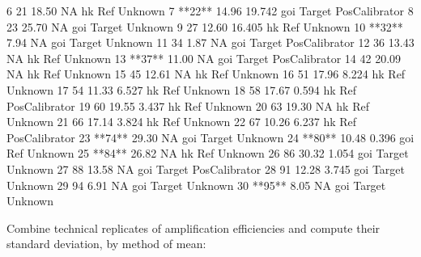 \documentclass[11pt]{article}
\begin{document}
\begin{Schunk}
\begin{Soutput}
6      21 18.50     NA                hk                     Ref Unknown
7  **22** 14.96 19.742               goi            Target PosCalibrator
8      23 25.70     NA               goi                  Target Unknown
9      27 12.60 16.405                hk                     Ref Unknown
10 **32**  7.94     NA               goi                  Target Unknown
11     34  1.87     NA               goi            Target PosCalibrator
12     36 13.43     NA                hk                     Ref Unknown
13 **37** 11.00     NA               goi            Target PosCalibrator
14     42 20.09     NA                hk                     Ref Unknown
15     45 12.61     NA                hk                     Ref Unknown
16     51 17.96  8.224                hk                     Ref Unknown
17     54 11.33  6.527                hk                     Ref Unknown
18     58 17.67  0.594                hk               Ref PosCalibrator
19     60 19.55  3.437                hk                     Ref Unknown
20     63 19.30     NA                hk                     Ref Unknown
21     66 17.14  3.824                hk                     Ref Unknown
22     67 10.26  6.237                hk               Ref PosCalibrator
23 **74** 29.30     NA               goi                  Target Unknown
24 **80** 10.48  0.396               goi                     Ref Unknown
25 **84** 26.82     NA                hk                     Ref Unknown
26     86 30.32  1.054               goi                  Target Unknown
27     88 13.58     NA               goi            Target PosCalibrator
28     91 12.28  3.745               goi                  Target Unknown
29     94  6.91     NA               goi                  Target Unknown
30 **95**  8.05     NA               goi                  Target Unknown
\end{Soutput}
\end{Schunk}

Combine technical replicates of amplification efficiencies and compute their standard deviation, by method of mean:
\end{document}

